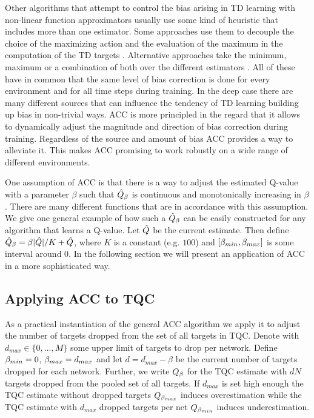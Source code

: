 Other algorithms that attempt to control the bias arising in TD learning with non-linear function approximators usually use some kind of heuristic that includes more than one estimator.
Some approaches use them to decouple the choice of the maximizing action and the evaluation of the maximum in the computation of the TD targets \cite{hasselt2016deepdouble}. 
Alternative approaches take the  minimum, maximum or a combination of both over the different estimators \cite{td3,Lan2020Maxmin,agarwal2020optimistic,fujimoto2019off}.
All of these have in common that the same level of bias correction is done for every environment and for all time steps during training.
In the deep case there are many different sources that can influence the tendency of TD learning building up bias in non-trivial ways.
ACC is more principled in the regard that it allows to dynamically adjust the magnitude and direction of bias correction during training.
Regardless of the source and amount of bias ACC provides a way to alleviate it. This makes ACC promising to work robustly on a wide range of different environments. 



One assumption of ACC is that there is a way to adjust the estimated Q-value with a parameter $\beta$ such that $\hat{Q}_{\beta}$ is continuous and monotonically increasing in $\beta$. 
There are many different functions that are in accordance with this assumption.
We give one general example of how such a $\hat{Q}_{\beta}$ can be easily constructed for any algorithm that learns a Q-value.
Let $\hat{Q}$ be the current estimate. 
Then define $\hat{Q}_{\beta} = \beta |\hat{Q}| / K + \hat{Q}$, where $K$ is a constant (e.g. $100$) and $[\beta_{min},\beta_{max}]$ is some interval around $0$.
In the following section we will present an application of ACC in a more sophisticated way.


 



\subsection{ Applying ACC to TQC}

As a practical instantiation of the general ACC algorithm we apply it to adjust the number of targets dropped from the set of all targets in TQC. 
Denote with $d_{max} \in \{0,\dots, M \}$ some upper limit of targets to drop per network.
Define $\beta_{min}=0$, $\beta_{max}=d_{max}$ and let $d = d_{max} - \beta$ be the current number of targets dropped for each network. Further, we write $Q_{\beta}$ for the TQC estimate with $dN$ targets dropped from the pooled set of all targets. 
If $d_{max}$ is set high enough the TQC estimate without dropped targets $Q_{\beta_{max}}$ induces overestimation 
while the TQC estimate with $d_{max}$ dropped targets per net $Q_{\beta_{min}}$ induces underestimation. 

